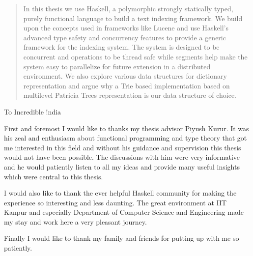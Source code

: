 \begin{abstract}
In this thesis we use Haskell, a polymorphic strongly statically typed, purely functional language to build a text indexing framework.
We build upon the concepts used in frameworks like Lucene and use Haskell's advanced type safety and concurrency features to
provide a generic framework for the indexing system.
The system is designed to be concurrent and operations to be thread safe while segments help
make the system easy to parallelize for future extension in a distributed environment.
We also explore various data structures for dictionary representation and argue why a Trie based implementation
based on multilevel Patricia Trees representation is our data structure of choice.
\end{abstract}

\begin{dedication}
To Incredible !ndia
\end{dedication}

\begin{acknowledgments}
First and foremost I would like to thanks my thesis advisor Piyush Kurur.
It was his zeal and enthusiasm about functional programming and type theory that got me interested in this field
and without his guidance and supervision this thesis would not have been possible.
The discussions with him were very informative and he would patiently listen to all my ideas and provide many useful insights
which were central to this thesis.

I would also like to thank the ever helpful Haskell community for making the experience so interesting and less daunting.
The great environment at IIT Kanpur and especially Department of Computer Science and Engineering made my stay and work here
a very pleasant journey.

Finally I would like to thank my family and friends for putting up with me so patiently.
\end{acknowledgments}

\tableofcontents
\listoftables

\cleardoublepage

\renewcommand\listingscaption{Program}
\renewcommand\listoflistingscaption{List of Programs}
\listoflistings

\listoffigures{}

\cleardoublepage
{} %

